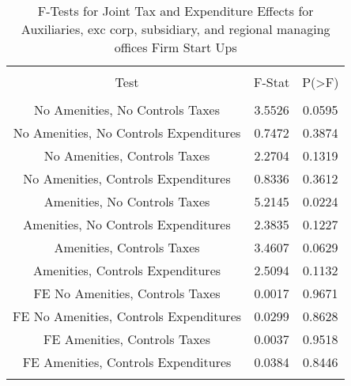 
\begin{table}[!htbp] \centering 
  \caption{F-Tests for Joint Tax and Expenditure Effects for Auxiliaries, exc corp, subsidiary, and regional managing offices Firm Start Ups} 
  \label{95Ftests} 
\begin{tabular}{@{\extracolsep{5pt}} ccc} 
\\[-1.8ex]\hline 
\hline \\[-1.8ex] 
Test & F-Stat & P(\textgreater F) \\ 
\hline \\[-1.8ex] 
No Amenities, No Controls Taxes & 3.5526 & 0.0595 \\ 
No Amenities, No Controls Expenditures & 0.7472 & 0.3874 \\ 
No Amenities, Controls Taxes & 2.2704 & 0.1319 \\ 
No Amenities, Controls Expenditures & 0.8336 & 0.3612 \\ 
Amenities, No Controls Taxes & 5.2145 & 0.0224 \\ 
Amenities, No Controls Expenditures & 2.3835 & 0.1227 \\ 
Amenities, Controls Taxes & 3.4607 & 0.0629 \\ 
Amenities, Controls Expenditures & 2.5094 & 0.1132 \\ 
FE No Amenities, Controls Taxes & 0.0017 & 0.9671 \\ 
FE No Amenities, Controls Expenditures & 0.0299 & 0.8628 \\ 
FE Amenities, Controls Taxes & 0.0037 & 0.9518 \\ 
FE Amenities, Controls Expenditures & 0.0384 & 0.8446 \\ 
\hline \\[-1.8ex] 
\end{tabular} 
\end{table} 

